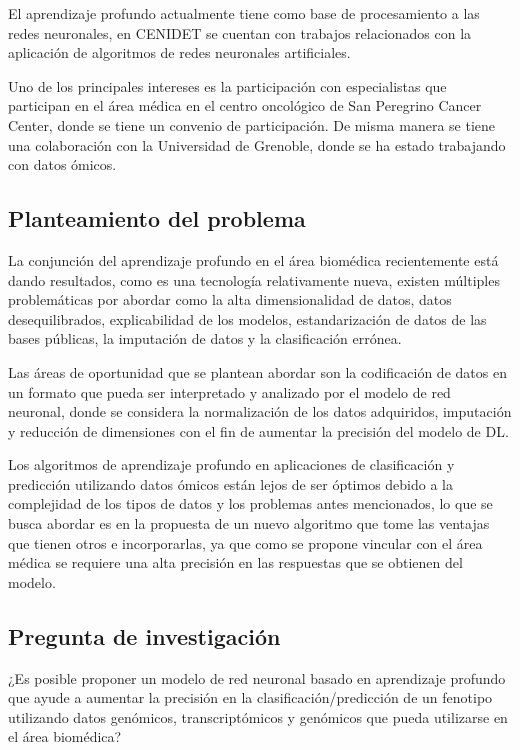 El aprendizaje profundo actualmente tiene como base de procesamiento a las redes neuronales, en CENIDET se cuentan con trabajos relacionados con la aplicación de algoritmos de redes neuronales artificiales.

Uno de los principales intereses es la participación con especialistas que participan en el área médica en el centro oncológico de San Peregrino Cancer Center, donde se tiene un convenio de participación. De misma manera se tiene una colaboración con la Universidad de Grenoble, donde se ha estado trabajando con datos ómicos.

\subsection{Planteamiento del problema}

La conjunción del aprendizaje profundo en el área biomédica recientemente está dando resultados, como es una tecnología relativamente nueva, existen múltiples problemáticas por abordar como la alta dimensionalidad de datos, datos desequilibrados, explicabilidad de los modelos, estandarización de datos de las bases públicas, la imputación de datos y la clasificación errónea.

Las áreas de oportunidad que se plantean abordar son la codificación de datos en un formato que pueda ser interpretado y analizado por el modelo de red neuronal, donde se considera la normalización de los datos adquiridos, imputación y reducción de dimensiones con el fin de aumentar la precisión del modelo de DL.

Los algoritmos de aprendizaje profundo en aplicaciones de clasificación y predicción utilizando datos ómicos están lejos de ser óptimos debido a la complejidad de los tipos de datos y los problemas antes mencionados, lo que se busca abordar es en la propuesta de un nuevo algoritmo que tome las ventajas que tienen otros e incorporarlas, ya que como se propone vincular con el área médica se requiere una alta precisión en las respuestas que se obtienen del modelo.

\subsection{Pregunta de investigación}

¿Es posible proponer un modelo de red neuronal basado en aprendizaje profundo que ayude a aumentar la precisión en la clasificación/predicción de un fenotipo utilizando datos genómicos, transcriptómicos y genómicos que pueda utilizarse en el área biomédica?

